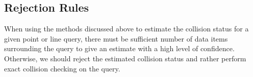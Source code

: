 
\subsection{Rejection Rules}
\label{subsec:3:knnreasoning:rejection}
When using the methods discussed above to estimate the collision status for a given point or line query, there must be sufficient number of data items surrounding the query to give an estimate with a high level of confidence. Otherwise, we should reject the estimated collision status and rather perform exact collision checking on the query.

